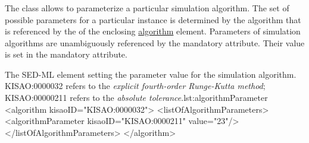  \subsubsection{}
\label{class:algorithmParameter}

The  class allows to parameterize a particular simulation algorithm. The set of possible parameters for a particular instance is determined by the algorithm that is referenced by the  of the enclosing \hyperref[class:algorithm]{algorithm} element. Parameters of simulation algorithms are unambiguously referenced by the mandatory  attribute. Their value is set in the mandatory  attribute.

\begin{myXmlLst}{The SED-ML  element setting the parameter value for the simulation algorithm. KISAO:0000032 refers to the \emph{explicit fourth-order Runge-Kutta method}; KISAO:00000211 refers to the \emph{absolute tolerance}.}{lst:algorithmParameter}
<algorithm kisaoID="KISAO:0000032"> 
 <listOfAlgorithmParameters> 
  <algorithmParameter kisaoID="KISAO:0000211" value="23"/> 
 </listOfAlgorithmParameters> 
</algorithm>
\end{myXmlLst}

